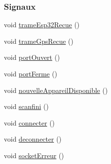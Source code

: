 \subsubsection*{Signaux}
\begin{DoxyCompactItemize}
\item 
void \hyperlink{class_transmission_a489a1ee2f15aec3594b44f0a6152cbe6}{trame\+Esp32\+Recue} ()
\item 
void \hyperlink{class_transmission_a4501908a4480b9b2ea4358dc85dc438d}{trame\+Gps\+Recue} ()
\item 
void \hyperlink{class_transmission_af4627b741806b2d4eb05fae07f2b0588}{port\+Ouvert} ()
\item 
void \hyperlink{class_transmission_a4ec325c36d76fbf830253ff16e9783a7}{port\+Ferme} ()
\item 
void \hyperlink{class_transmission_a8789222ce8dc94d657d66a6edbbcc588}{nouvelle\+Appareil\+Disponible} ()
\item 
void \hyperlink{class_transmission_a2558a386d6888478f7d56c672a4855b3}{scanfini} ()
\item 
void \hyperlink{class_transmission_a76ba0e916b9e30615d563b78e26acbc2}{connecter} ()
\item 
void \hyperlink{class_transmission_aa3cfe0fc92fcc2147d239553820c983c}{deconnecter} ()
\item 
void \hyperlink{class_transmission_ad42d923341b19d450d27c7659ea51a58}{socket\+Erreur} ()
\end{DoxyCompactItemize}
